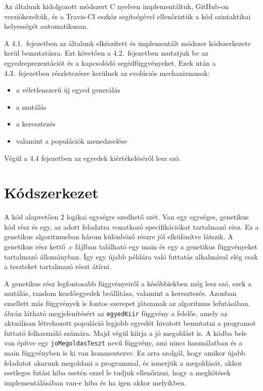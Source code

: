 \documentclass[12pt,a4paper,oneside]{report}
\begin{document}
    Az általunk kidolgozott módszert C nyelven implementáltuk, GitHub-on verziókezeltük, és a Travis-CI eszköz segítségével ellenőriztük a kód szintaktikai helyességét automatikusan.

	A 4.1.\ fejezetben az általunk elkészített és implementált módszer kódszerkezete kerül bemutatásra.
    Ezt követően a 4.2.\ fejezetben mutatjuk be az egyedreprezentációt és a kapcsolódó segédfüggvényeket.
	Ezek után a 4.3.\ fejezetben részletezésre kerülnek az evolúciós mechanizmusok:

	\begin{itemize}
        \item a véletlenszerű új egyed generálás
        \item a mutálás
        \item a keresztezés
        \item  valamint a populációk menedzselése
	\end{itemize}

	Végül a 4.4 fejezetben az egyedek kiértékeléséről lesz szó.


    \section{Kódszerkezet} %
		A kód alapvetően 2 logikai egységre szedhető szét.
		Van egy egységes, genetikus kód rész és egy, az adott feladatra vonatkozó specifikációkat tartalmazó rész.
		Ez a genetikus algoritmusban három különböző részre jól elkülönítve látszik.
		A genetikus rész kettő .c fájlban található egy main és egy a genetikus függvényeket tartalmazó állományban.
		Így egy újabb példára való futtatás alkalmával elég csak a teszteket tartalmazó részt átírni.
		
		
		A genetikus rész legfontosabb függvényeiről a későbbiekben még lesz szó, ezek a mutálás, random kezdőegyedek beállítása, valamint a keresztezés.
		Azonban emellett más függvények is fontos szerepet játszanak az algoritmus lefutásában.
		 ábrán látható megjelenítésért az \texttt{egyedKiir} függvény a felelős, amely az aktuálisan létrehozott populáció legjobb egyedét hivatott bemutatni a programot futtató felhasználó számára.
		Majd végül kiírja a jó megoldást is.
		A kódba bele van építve egy \texttt{joMegoldasTeszt} nevű függvény, ami nincs használatban és a main függvényben is ki van kommentezve.
		Ez arra szolgál, hogy amikor újabb feladatot akarunk megoldani a programmal, és ismerjük a megoldását, akkor esetleges futási hiba esetén ezzel le tudjuk ellenőrizni, hogy a megkötések implementálásában van-e hiba és ha igen akkor melyikben.
		
\end{document}
